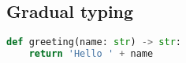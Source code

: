 \subsection{Gradual typing}



\begin{lstlisting}[language=Python]
def greeting(name: str) -> str:
    return 'Hello ' + name
\end{lstlisting}